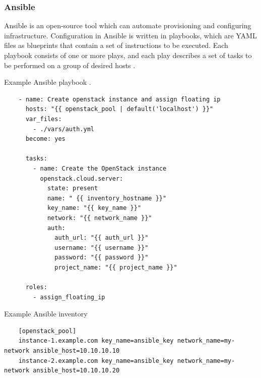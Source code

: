 \subsubsection{Ansible}
\label{sec:ansible}

Ansible is an open-source tool which can automate provisioning and configuring infrastructure. Configuration in Ansible is written in playbooks, which are YAML files as blueprints that contain a set of instructions to be executed. Each playbook consists of one or more plays, and each play describes a set of tasks to be performed on a group of desired hosts \cite{Ansible} \cite{AnsiblePlaybook}.

\begin{listing}[htb]
    \centering
    \caption{Example Ansible playbook \cite{AnsibleOpenstack}.}
    \begin{verbatim}
    - name: Create openstack instance and assign floating ip
      hosts: "{{ openstack_pool | default('localhost') }}"
      var_files:
        - ./vars/auth.yml
      become: yes
  
      tasks:
        - name: Create the OpenStack instance
          openstack.cloud.server:
            state: present
            name: " {{ inventory_hostname }}"
            key_name: "{{ key_name }}"
            network: "{{ network_name }}"
            auth:
              auth_url: "{{ auth_url }}"
              username: "{{ username }}"
              password: "{{ password }}"
              project_name: "{{ project_name }}"
  
      roles:
        - assign_floating_ip

    \end{verbatim}
    \label{lst:exampleAnsiblePlaybook}
\end{listing}

\begin{listing}[htb]
    \centering
    \caption{Example Ansible inventory \cite{AnsibleInventory} \cite{AnsibleOpenstack} \cite{AnsibleVars}}
    \begin{verbatim}
    [openstack_pool]
    instance-1.example.com key_name=ansible_key network_name=my-network ansible_host=10.10.10.10
    instance-2.example.com key_name=ansible_key network_name=my-network ansible_host=10.10.10.20
    \end{verbatim}
    \label{lst:exampleAnsibleInventory}
\end{listing}


